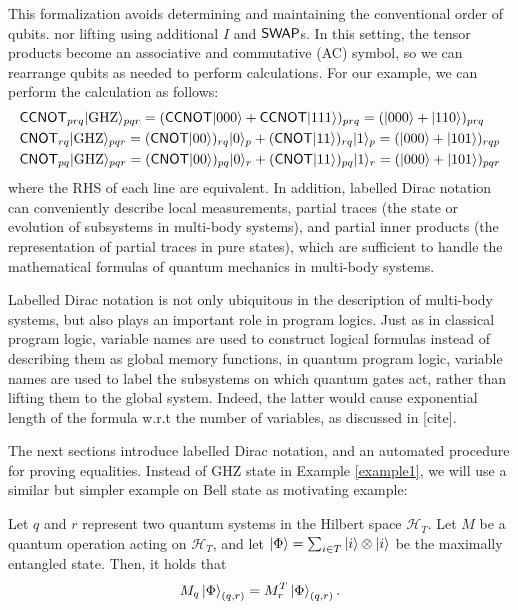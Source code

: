 This formalization avoids determining and maintaining the conventional
order of qubits. nor lifting using additional $I$ and ${\mathsf{SWAP}}$s. In
this setting, the tensor products become an associative and
commutative (AC) symbol, so we can rearrange qubits as needed to
perform calculations. For our example, we can perform the calculation as
follows:
\begin{align*}
  &{\mathsf{CCNOT}}_{prq}|{\mathrm{GHZ}}\rangle_{pqr}
  = ({\mathsf{CCNOT}}|000\rangle + {\mathsf{CCNOT}}|111\rangle)_{prq}
  = (|000\rangle + |110\rangle)_{prq}\\
  &{\mathsf{CNOT}}_{rq}|{\mathrm{GHZ}}\rangle_{pqr}
  = ({\mathsf{CNOT}}|00\rangle)_{rq}|0\rangle_p + ({\mathsf{CNOT}}|11\rangle)_{rq}|1\rangle_p
  =(|000\rangle + |101\rangle)_{rqp}\\
  &{\mathsf{CNOT}}_{pq}|{\mathrm{GHZ}}\rangle_{pqr}
  = ({\mathsf{CNOT}}|00\rangle)_{pq}|0\rangle_r + ({\mathsf{CNOT}}|11\rangle)_{pq}|1\rangle_r
  = (|000\rangle + |101\rangle)_{pqr}
\end{align*}
where the RHS of each line are equivalent.  In addition, labelled
Dirac notation can conveniently describe local measurements, partial
traces (the state or evolution of subsystems in multi-body systems),
and partial inner products (the representation of partial traces in
pure states), which are sufficient to handle the mathematical formulas
of quantum mechanics in multi-body systems.

Labelled Dirac notation is not only ubiquitous in the description of multi-body systems, but also plays an important role in program logics. Just as in classical program logic, variable names are used to construct logical formulas instead of describing them as global memory functions, in quantum program logic, variable names are used to label the subsystems on which quantum gates act, rather than lifting them to the global system. Indeed, the latter would cause exponential length of the formula w.r.t the number of variables, as discussed in [cite].

The next sections introduce labelled Dirac notation, and an automated
procedure for proving equalities. 
Instead of GHZ state in Example \ref{example1}, we will use a similar but simpler example on Bell state as motivating example:
\begin{example}
    \label{ex: motivating}
    Let \( q \) and \( r \) represent two quantum systems in the Hilbert space \( \mathcal{H}_T \). Let \( M \) be a quantum operation acting on \( \mathcal{H}_T \), and let \( \ket{\Phi} = \sum_{i \in T} \ket{i} \otimes \ket{i} \) be the maximally entangled state. Then, it holds that
    \[
    M_q \ket{\Phi}_{(q, r)} = M_r^T \ket{\Phi}_{(q, r)}.
    \]
\end{example}

